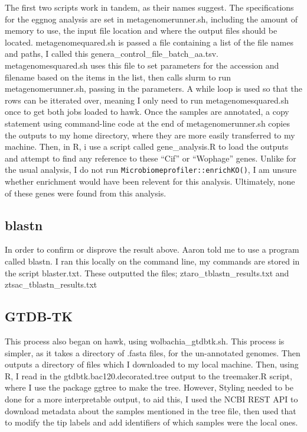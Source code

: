 \documentclass[
  letterpaper,
  DIV=11,
  numbers=noendperiod]{scrreprt}
\begin{document}
The first two scripts work in tandem, as their names suggest. The
specifications for the eggnog analysis are set in metagenomerunner.sh,
including the amount of memory to use, the input file location and where
the output files should be located. metagenomequared.sh is passed a file
containing a list of the file names and paths, I called this
genera\_control\_file\_batch\_aa.tsv. metagenomesquared.sh uses this
file to set parameters for the accession and filename based on the items
in the list, then calls slurm to run metagenomerunner.sh, passing in the
parameters. A while loop is used so that the rows can be itterated over,
meaning I only need to run metagenomesquared.sh once to get both jobs
loaded to hawk. Once the samples are annotated, a copy statement using
command-line code at the end of metagenomerunner.sh copies the outputs
to my home directory, where they are more easily transferred to my
machine. Then, in R, i use a script called gene\_analysis.R to load the
outputs and attempt to find any reference to these ``Cif'' or
``Wophage'' genes. Unlike for the usual analysis, I do not run
\texttt{Microbiomeprofiler::enrichKO()}, I am unsure whether enrichment
would have been relevent for this analysis. Ultimately, none of these
genes were found from this analysis.

\subsection{blastn}\label{blastn}

In order to confirm or disprove the result above. Aaron told me to use a
program called blastn. I ran this locally on the command line, my
commands are stored in the script blaster.txt. These outputted the
files; ztaro\_tblastn\_results.txt and ztsac\_tblastn\_results.txt

\subsection{GTDB-TK}\label{gtdb-tk}

This process also began on hawk, using wolbachia\_gtdbtk.sh. This
process is simpler, as it takes a directory of .fasta files, for the
un-annotated genomes. Then outputs a directory of files which I
downloaded to my local machine. Then, using R, I read in the
gtdbtk.bac120.decorated.tree output to the treemaker.R script, where I
use the package ggtree to make the tree. However, Styling needed to be
done for a more interpretable output, to aid this, I used the NCBI REST
API to download metadata about the samples mentioned in the tree file,
then used that to modify the tip labels and add identifiers of which
samples were the local ones.
\end{document}
